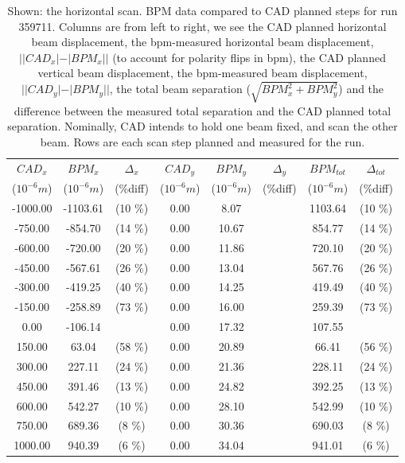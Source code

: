 \begin{table}[ht]
  \centering
  \begin{tabular}{c c c c c c c c}
    \toprule
    \textbf{$CAD_{x}$} & \textbf{$BPM_{x}$ } & \textbf{$\Delta_{x}$} &\textbf{$CAD_{y}$} & \textbf{$BPM_{y}$} & \textbf{$\Delta_{y}$} & \textbf{$BPM_{tot}$} & \textbf{$\Delta_{tot}$} \\
    ($10^{-6} m$) & ($10^{-6} m$) & (\%diff) & ($10^{-6} m$) & ($10^{-6} m$) & (\%diff) & ($10^{-6} m$) & (\%diff) \\
    \midrule
    -1000.00 & -1103.61 &  (10 \%) & 0.00 & 8.07 &  & 1103.64 &  (10 \%)\\
    -750.00 & -854.70 &  (14 \%) & 0.00 & 10.67 &  & 854.77 &  (14 \%)\\
    -600.00 & -720.00 &  (20 \%) & 0.00 & 11.86 &  & 720.10 &  (20 \%)\\
    -450.00 & -567.61 &  (26 \%) & 0.00 & 13.04 &  & 567.76 &  (26 \%)\\
    -300.00 & -419.25 &  (40 \%) & 0.00 & 14.25 &  & 419.49 &  (40 \%)\\
    -150.00 & -258.89 &  (73 \%) & 0.00 & 16.00 &  & 259.39 &  (73 \%)\\
    0.00 & -106.14 &  & 0.00 & 17.32 &  & 107.55 & \\
    150.00 & 63.04 &  (58 \%) & 0.00 & 20.89 &  & 66.41 &  (56 \%)\\
    300.00 & 227.11 &  (24 \%) & 0.00 & 21.36 &  & 228.11 &  (24 \%)\\
    450.00 & 391.46 &  (13 \%) & 0.00 & 24.82 &  & 392.25 &  (13 \%)\\
    600.00 & 542.27 &  (10 \%) & 0.00 & 28.10 &  & 542.99 &  (10 \%)\\
    750.00 & 689.36 &  (8 \%) & 0.00 & 30.36 &  & 690.03 &  (8 \%)\\
    1000.00 & 940.39 &  (6 \%) & 0.00 & 34.04 &  & 941.01 &  (6 \%)\\
    \bottomrule
  \end{tabular}
  \caption{ 
    Shown: the horizontal scan. BPM data compared to CAD planned steps for run
    359711.  Columns are from left to right, we see the CAD planned horizontal
    beam displacement, the bpm-measured horizontal beam displacement,
    $||CAD_{x}| - |BPM_{x}||$ (to account for polarity flips in bpm), the CAD
    planned vertical beam displacement, the bpm-measured beam displacement,
    $||CAD_{y}| - |BPM_{y}||$, the total beam separation
    ($\sqrt{BPM_{x}^2+BPM_{y}^2}$) and the difference between the measured total
    separation and the CAD planned total separation. Nominally, CAD intends to
    hold one beam fixed, and scan the other beam. Rows are each scan step
    planned and measured for the run. 
  }
  \label{fig:bpm_data_example_h}
\end{table}

